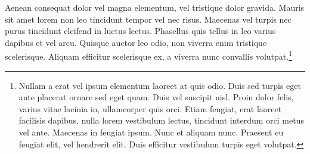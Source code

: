 Aenean consequat dolor vel magna elementum, vel tristique dolor gravida. Mauris sit amet lorem non leo tincidunt tempor vel nec risus. Maecenas vel turpis nec purus tincidunt eleifend in luctus lectus. Phasellus quis tellus in leo varius dapibus et vel arcu. Quisque auctor leo odio, non viverra enim tristique scelerisque. Aliquam efficitur scelerisque ex, a viverra nunc convallis volutpat.\footnote[5]{Nullam a erat vel ipsum elementum laoreet at quis odio. Duis sed turpis eget ante placerat ornare sed eget quam. Duis vel suscipit nisl. Proin dolor felis, varius vitae lacinia in, ullamcorper quis orci. Etiam feugiat, erat laoreet facilisis dapibus, nulla lorem vestibulum lectus, tincidunt interdum orci metus vel ante. Maecenas in feugiat ipsum. Nunc et aliquam nunc. Praesent eu feugiat elit, vel hendrerit elit. Duis efficitur vestibulum turpis eget volutpat.}



